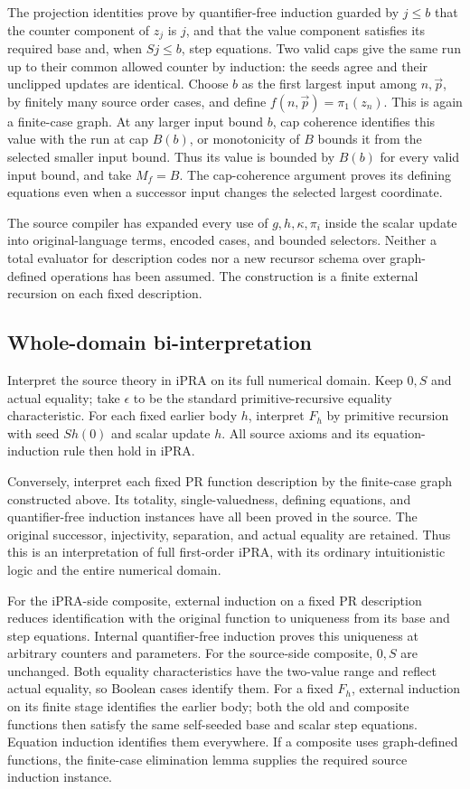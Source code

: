 The projection identities prove by quantifier-free induction guarded
by $j\le b$ that the counter component of $z_j$ is $j$, and that the
value component satisfies its required base and, when $Sj\le b$,
step equations. Two valid caps
give the same run up to their common allowed counter by induction:
the seeds agree and their unclipped updates are identical. Choose
$b$ as the first largest input among $n,\vec p$, by finitely many
source order cases, and define $f(n,\vec p)=\pi_1(z_n)$. This is
again a finite-case graph. At any larger input bound $b$, cap coherence
identifies this value with the run at cap $B(b)$, or monotonicity of
$B$ bounds it from the selected smaller input bound. Thus its value
is bounded by $B(b)$ for every valid input bound, and take $M_f=B$.
The cap-coherence argument proves its defining equations
even when a successor input changes the selected largest coordinate.

The source compiler has expanded every use of $g,h,\kappa,\pi_i$
inside the scalar update into original-language terms, encoded cases,
and bounded selectors. Neither a total evaluator for description
codes nor a new recursor schema over graph-defined operations has
been assumed. The construction is a finite external recursion on
each fixed description.

\subsection{Whole-domain bi-interpretation}
Interpret the source theory in iPRA on its full numerical domain.
Keep $0,S$ and actual equality; take $\epsilon$ to be the standard
primitive-recursive equality characteristic. For each fixed earlier
body $h$, interpret $F_h$ by primitive recursion with seed $S h(0)$
and scalar update $h$. All source axioms and its equation-induction
rule then hold in iPRA.

Conversely, interpret each fixed PR function description by the
finite-case graph constructed above. Its totality, single-valuedness,
defining equations, and quantifier-free induction instances have all
been proved in the source. The original successor, injectivity,
separation, and actual equality are retained. Thus this is an
interpretation of full first-order iPRA, with its ordinary intuitionistic
logic and the entire numerical domain.

For the iPRA-side composite, external induction on a fixed PR
description reduces identification with the original function to
uniqueness from its base and step equations. Internal quantifier-free
induction proves this uniqueness at arbitrary counters and parameters.
For the source-side composite, $0,S$ are unchanged. Both equality
characteristics have the two-value range and reflect actual equality,
so Boolean cases identify them. For a fixed $F_h$, external induction
on its finite stage identifies the earlier body; both the old and
composite functions then satisfy the same self-seeded base and scalar
step equations. Equation induction identifies them everywhere. If a
composite uses graph-defined functions, the finite-case elimination
lemma supplies the required source induction instance.

